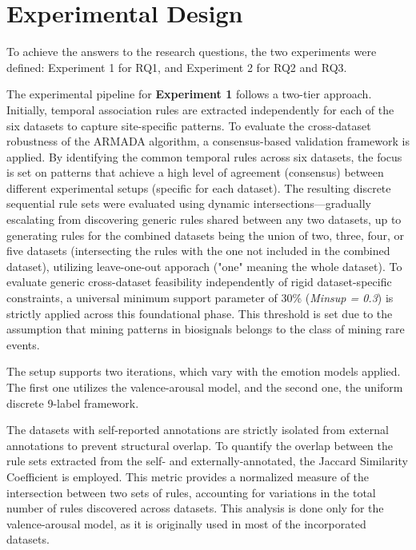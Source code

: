 \documentclass{isd}
\begin{document}
{\section{Experimental Design}
\label{sec:experimentalDesign}

To achieve the answers to the research questions, the two experiments were defined: Experiment 1 for RQ1, and Experiment 2 for RQ2 and RQ3. 

The experimental pipeline for \textbf{Experiment 1} follows a two-tier approach. Initially, temporal association rules are extracted independently for each of the six datasets to capture site-specific patterns. To evaluate the cross-dataset robustness of the ARMADA algorithm, a consensus-based validation framework is applied. By identifying the common temporal rules across six datasets, the focus is set on patterns that achieve a high level of agreement (consensus) between different experimental setups (specific for each dataset). The resulting discrete sequential rule sets were evaluated using dynamic intersections—gradually escalating from discovering generic rules shared between any two datasets, up to generating rules for the combined datasets being the union of two, three, four, or five datasets (intersecting the rules with the one not included in the combined dataset), utilizing leave-one-out apporach ("one" meaning the whole dataset). To evaluate generic cross-dataset feasibility independently of rigid dataset-specific constraints, a universal minimum support parameter of 30\% (\textit{Minsup = 0.3}) is strictly applied across this foundational phase. This threshold is set due to the assumption that mining patterns in biosignals belongs to the class of mining rare events.

The setup supports two iterations, which vary with the emotion models applied. The first one utilizes the valence-arousal model, and the second one, the uniform discrete 9-label framework.

The datasets with self-reported annotations are strictly isolated from external annotations to prevent structural overlap. To quantify the overlap between the rule sets extracted from the self- and externally-annotated, the Jaccard Similarity Coefficient is employed. This metric provides a normalized measure of the intersection between two sets of rules, accounting for variations in the total number of rules discovered across datasets. This analysis is done only for the valence-arousal model, as it is originally used in most of the incorporated datasets.

}
\end{document}
